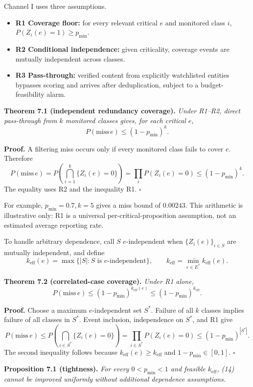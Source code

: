 \documentclass[
  11pt]{article}
\providecommand{\tightlist}{%
  \setlength{\itemsep}{0pt}\setlength{\parskip}{0pt}}
\begin{document}
Channel I uses three assumptions.

\begin{itemize}
\tightlist
\item
  \textbf{R1 Coverage floor:} for every relevant critical \(e\) and monitored class \(i\), \(P(Z_i(e)=1)\geq p_{\min}\).
\item
  \textbf{R2 Conditional independence:} given criticality, coverage events are mutually independent across classes.
\item
  \textbf{R3 Pass-through:} verified content from explicitly watchlisted entities bypasses scoring and arrives after deduplication, subject to a budget-feasibility alarm.
\end{itemize}

\textbf{Theorem 7.1 (independent redundancy coverage).} \emph{Under R1--R2, direct pass-through from \(k\) monitored classes gives, for each critical \(e\),} \[
P(\mathrm{miss}\,e)\leq(1-p_{\min})^k.
\tag{13}
\]

\textbf{Proof.} A filtering miss occurs only if every monitored class fails to cover \(e\). Therefore \[
P(\mathrm{miss}\,e)=P\!\left(\bigcap_{i=1}^k\{Z_i(e)=0\}\right)
=\prod_iP(Z_i(e)=0)\leq(1-p_{\min})^k.
\] The equality uses R2 and the inequality R1. \(\square\)

For example, \(p_{\min}=0.7,k=5\) gives a miss bound of \(0.00243\). This arithmetic is illustrative only: R1 is a universal per-critical-proposition assumption, not an estimated average reporting rate.

To handle arbitrary dependence, call \(S\) \(e\)-independent when \(\{Z_i(e)\}_{i\in S}\) are mutually independent, and define \[
k_{\mathrm{eff}}(e)=\max\{|S|:S\text{ is }e\text{-independent}\},
\qquad k_{\mathrm{eff}}=\min_{e\in E^*}k_{\mathrm{eff}}(e).
\]

\textbf{Theorem 7.2 (correlated-case coverage).} \emph{Under R1 alone,} \[
P(\mathrm{miss}\,e)\leq(1-p_{\min})^{k_{\mathrm{eff}}(e)}
\leq(1-p_{\min})^{k_{\mathrm{eff}}}.
\tag{14}
\]

\textbf{Proof.} Choose a maximum \(e\)-independent set \(S^*\). Failure of all \(k\) classes implies failure of all classes in \(S^*\). Event inclusion, independence on \(S^*\), and R1 give \[
P(\mathrm{miss}\,e)\leq P\!\left(\bigcap_{i\in S^*}\{Z_i(e)=0\}\right)
=\prod_{i\in S^*}P(Z_i(e)=0)
\leq(1-p_{\min})^{|S^*|}.
\] The second inequality follows because \(k_{\mathrm{eff}}(e)\geq k_{\mathrm{eff}}\) and \(1-p_{\min}\in[0,1]\). \(\square\)

\textbf{Proposition 7.1 (tightness).} \emph{For every \(0<p_{\min}<1\) and feasible \(k_{\mathrm{eff}}\), (14) cannot be improved uniformly without additional dependence assumptions.}
\end{document}
